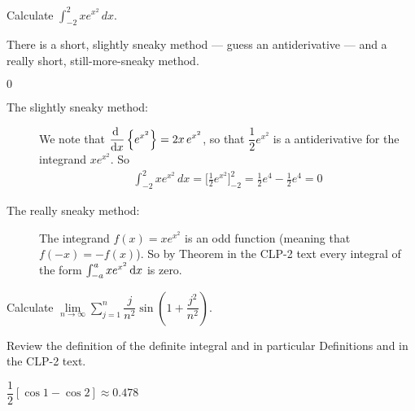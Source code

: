 \begin{question}[2016A]
Calculate $\displaystyle\int_{-2}^2 xe^{x^2}\,dx$.
\end{question}

\begin{hint}
There is a short, slightly sneaky method --- guess an antiderivative ---
and a really short, still-more-sneaky method.
\end{hint}

\begin{answer}
$0$
\end{answer}

\begin{solution}
\begin{description}
\item[The slightly sneaky method:]
We note that $\displaystyle\diff{}{x} \left\{e^{x^2} \right\}= 2x\, e^{x^2}$, so that $\dfrac{1}{2} e^{x^2}$
is a antiderivative for the integrand $x e^{x^2}$. So
\begin{align*}
\int_{-2}^2 xe^{x^2}\,dx = \bigg[\frac{1}{2}e^{x^2}\bigg]_{-2}^2
=\frac{1}{2}e^4-\frac{1}{2}e^4=0
\end{align*}


\item[The really sneaky method:]
The integrand $f(x) = x e^{x^2}$ is an odd function (meaning that $f(-x)=-f(x)$).
So by Theorem  in the  CLP-2 text every integral
of the form $\int_{-a}^a x e^{x^2}\,\mathrm{d}x$ is zero.
\end{description}
\end{solution}



\begin{question}[2000D]
Calculate $\displaystyle\lim\limits_{n\rightarrow\infty}\sum\limits_{j=1}^n
\dfrac{j}{n^2}\sin\left(1+\dfrac{j^2}{n^2}\right)$.
\end{question}

\begin{hint}
Review the definition of the definite integral and in particular
Definitions    and
                  in the
CLP-2 text.
\end{hint}

\begin{answer}
$\dfrac{1}{2}[\cos 1-\cos 2]\approx0.478$
\end{answer}

